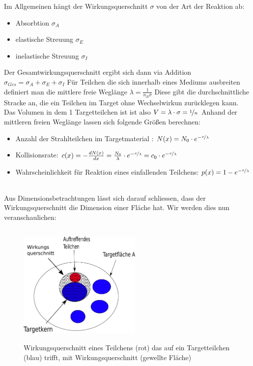 \documentclass[Ex4_Zusammenfassung.tex]{subfiles}
\begin{document}
Im Allgemeinen hängt der Wirkungsquerschnitt  $ \sigma $ von der Art der Reaktion ab: 
\begin{itemize}
\item Absorbtion $ \sigma_{A} $
\item elastische Streuung $ \sigma_{E} $
\item inelastische Streuung $ \sigma_{I} $
\end{itemize}
Der Gesamtwirkungsquerschnitt ergibt sich dann via Addition $ \sigma_{Ges} = \sigma_{A} + \sigma_{E} + \sigma_{I}  $ \newline
Für Teilchen die sich innerhalb eines Mediums ausbreiten definiert man die mittlere freie Weglänge $ \lambda = \frac{1}{n_B \sigma}$ \newline
Diese gibt die durchschnittliche Stracke an, die ein Teilchen im Target ohne Wechselwirkun zurücklegen kann. \newpage
Das Volumen in dem 1 Targetteilchen ist ist also $ V = \lambda \cdot \sigma = \nicefrac{1}{n} $  \newline
Anhand der mittleren freien Weglänge lassen sich folgende Größen berechnen: 
\begin{itemize}
\item Anzahl der Strahlteilchen im Targetmaterial : $ N(x) = N_{0} \cdot e^{-\nicefrac{x}{\lambda}} $
\item Kollisionsrate: $ c(x) = - \frac{dN(x)}{dx} = \frac{N_{0}}{\lambda} \cdot e^{-\nicefrac{x}{\lambda}} = c_0 \cdot e^{-\nicefrac{x}{\lambda}} $
\item Wahrscheinlichkeit für Reaktion eines einfallenden Teilchens: $  p(x) = 1- e^{-\nicefrac{x}{\lambda}} $
\end{itemize}
\ \\ 
Aus Dimensionsbetrachtungen lässt sich darauf schliessen, dass der Wirkungsquerschnitt die Dimension einer Fläche hat. Wir werden dies nun veranschaulichen: 
\begin{figure}[h]
\centering
\includegraphics[height=6cm,width=6cm]{wirkungsquerschnitt.png}
\caption{Wirkungsquerschnitt eines Teilchens (rot) das auf ein Targetteilchen (blau) trifft, mit Wirkungsquerschnitt (gewellte Fläche)}
\end{figure} \newline
\end{document}
